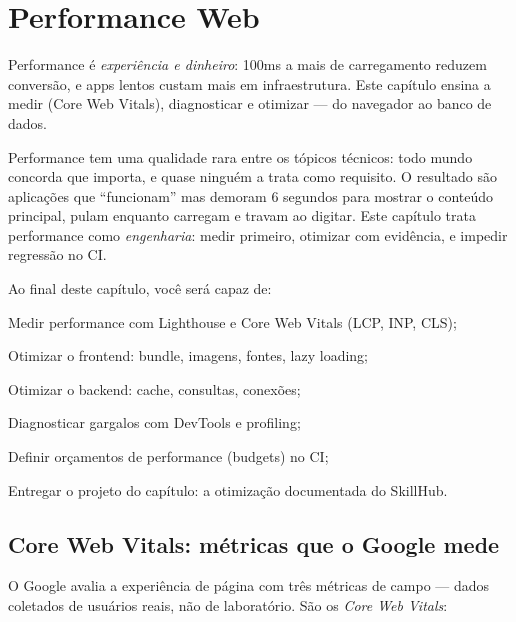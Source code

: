 \chapter{Performance Web}
\label{cap:performance}

\begin{caixaconceito}
Performance é \emph{experiência e dinheiro}: 100ms a mais de carregamento
reduzem conversão, e apps lentos custam mais em infraestrutura. Este capítulo
ensina a medir (Core Web Vitals), diagnosticar e otimizar — do navegador ao
banco de dados.
\end{caixaconceito}

Performance tem uma qualidade rara entre os tópicos técnicos: todo mundo
concorda que importa, e quase ninguém a trata como requisito. O resultado são
aplicações que ``funcionam'' mas demoram 6 segundos para mostrar o conteúdo
principal, pulam enquanto carregam e travam ao digitar. Este capítulo trata
performance como \emph{engenharia}: medir primeiro, otimizar com evidência,
e impedir regressão no CI.

Ao final deste capítulo, você será capaz de:
\begin{objetivos}
  \item Medir performance com Lighthouse e Core Web Vitals (LCP, INP, CLS);
  \item Otimizar o frontend: bundle, imagens, fontes, lazy loading;
  \item Otimizar o backend: cache, consultas, conexões;
  \item Diagnosticar gargalos com DevTools e profiling;
  \item Definir orçamentos de performance (budgets) no CI;
  \item Entregar o projeto do capítulo: a otimização documentada do SkillHub.
\end{objetivos}

\section{Core Web Vitals: métricas que o Google mede}

O Google avalia a experiência de página com três métricas de campo — dados
coletados de usuários reais, não de laboratório. São os \emph{Core Web
Vitals}:

